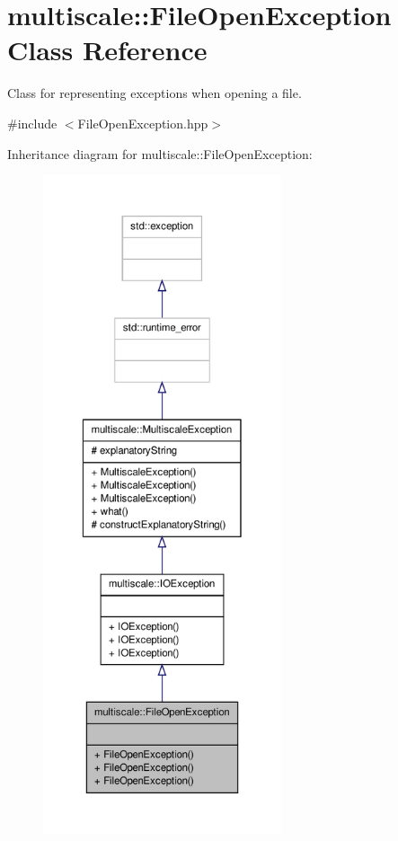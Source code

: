 \hypertarget{classmultiscale_1_1FileOpenException}{\section{multiscale\-:\-:\-File\-Open\-Exception \-Class \-Reference}
\label{classmultiscale_1_1FileOpenException}
}


\-Class for representing exceptions when opening a file.  




{\ttfamily \#include $<$\-File\-Open\-Exception.\-hpp$>$}



\-Inheritance diagram for multiscale\-:\-:\-File\-Open\-Exception\-:
\nopagebreak
\begin{figure}[H]
\begin{center}
\leavevmode
\includegraphics[height=550pt]{classmultiscale_1_1FileOpenException__inherit__graph}
\end{center}
\end{figure}


